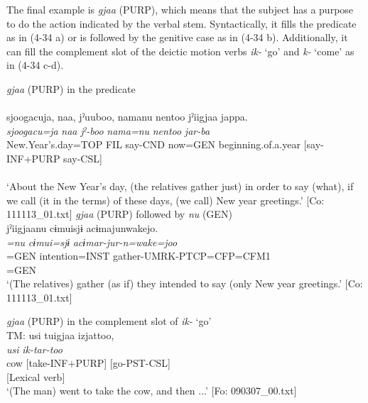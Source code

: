 The final example is \textit{gjaa} (PURP), which means that the subject has a purpose to do the action indicated by the verbal stem. Syntactically, it fills the predicate as in (4-34 a) or is followed by the genitive case as in (4-34 b). Additionally, it can fill the complement slot of the deictic motion verbs \textit{ik-} ‘go’ and \textit{k-} ‘come’ as in (4-34 c-d).

\ea \label{ex:4.34}
  \ea \textit{gjaa} (PURP) in the predicate \label{ex:4.34a}\\\\
\gllll 
    {\textbar}sjoogacu{\textbar}ja,  naa,  jˀuuboo,  namanu  {\textbar}nentoo{\textbar}   jˀiigjaa  jappa.\\
      \textit{sjoogacu=ja}  \textit{naa}  \textit{jˀ-boo}  \textit{nama=nu}  \textit{nentoo}   \textit{}  \textit{jar-ba}\\                                                                                               
      New.Year’s.day=TOP  FIL  say-CND  now=GEN  beginning.of.a.year                           [say-INF+PURP  say-CSL]\\                                                                                               
                                                                                               [Nominal predicate]\\
      \glt ‘About the New Year’s day, (the relatives gather just) in order to say (what), if we call (it in the terms) of these days, (we call) New year greetings.’ [Co: 111113\_01.txt]
\ex  \textit{gjaa} (PURP) followed by \textit{nu} (GEN)\\\label{ex:4.34b}
\gllll    jˀiigjaanu  cɨmuisjɨ  acɨmajunwakejo.\\
      \textit{=nu}  \textit{cɨmui=sjɨ}  \textit{acɨmar-jur-n=wake=joo}\\
      [say-INF+PURP]=GEN  intention=INST  gather-UMRK-PTCP=CFP=CFM1\\
      [NP]=GEN    \\
      \glt       ‘(The relatives) gather (as if) they intended to say (only New year greetings.’ [Co: 111113\_01.txt]

\ex \textit{gjaa} (PURP) in the complement slot of \textit{ik-} ‘go’\\\label{ex:4.34c}
\gllll    TM:  usi  tuigjaa  izjattoo,\\
      \textit{usi}  \textit{}  \textit{ik-tar-too}\\
      cow  [take-INF+PURP]  [go-PST-CSL]\\
        [Complement]  [Lexical verb]\\
      \glt       ‘(The man) went to take the cow, and then ...’ [Fo: 090307\_00.txt]

